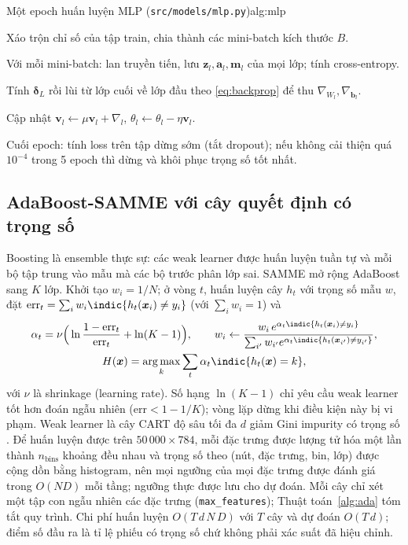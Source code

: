 \begin{algo}{Một epoch huấn luyện MLP (\texttt{src/models/mlp.py})}{alg:mlp}
\item Xáo trộn chỉ số của tập train, chia thành các mini-batch kích thước $B$.
\item Với mỗi mini-batch: lan truyền tiến, lưu $\bm z_l,\bm a_l,\bm m_l$ của mọi lớp; tính cross-entropy.
\item Tính $\bm\delta_L$ rồi lùi từ lớp cuối về lớp đầu theo \cref{eq:backprop} để thu $\nabla_{W_l},\nabla_{\bm b_l}$.
\item Cập nhật $\bm v_l\leftarrow\mu\bm v_l+\nabla_l$, $\theta_l\leftarrow\theta_l-\eta\bm v_l$.
\item Cuối epoch: tính loss trên tập dừng sớm (tắt dropout); nếu không cải thiện quá $10^{-4}$ trong 5 epoch thì dừng và khôi phục trọng số tốt nhất.
\end{algo}

\subsection{AdaBoost-SAMME với cây quyết định có trọng số}
\label{sec:ada}
Boosting là ensemble thực sự: các weak learner được huấn luyện tuần tự và mỗi bộ tập trung vào mẫu mà các bộ trước phân lớp sai. SAMME \citep{zhu2009} mở rộng AdaBoost \citep{freund1997} sang $K$ lớp. Khởi tạo $w_i=1/N$; ở vòng $t$, huấn luyện cây $h_t$ với trọng số mẫu $w$, đặt $\mathrm{err}_t=\sum_i w_i\indic{h_t(\bm x_i)\ne y_i}$ (với $\sum_i w_i=1$) và
\begin{equation}
\begin{gathered}
\alpha_t=\nu\Big(\ln\frac{1-\mathrm{err}_t}{\mathrm{err}_t}+\ln(K-1)\Big),\qquad
w_i\leftarrow \frac{w_i\,e^{\alpha_t\indic{h_t(\bm x_i)\ne y_i}}}{\sum_{i'}w_{i'}e^{\alpha_t\indic{h_t(\bm x_{i'})\ne y_{i'}}}},\\
H(\bm x)=\argmax_k\sum_{t}\alpha_t\indic{h_t(\bm x)=k},
\end{gathered}
\label{eq:samme}
\end{equation}
với $\nu$ là shrinkage (learning rate). Số hạng $\ln(K-1)$ chỉ yêu cầu weak learner tốt hơn đoán ngẫu nhiên ($\mathrm{err}<1-1/K$); vòng lặp dừng khi điều kiện này bị vi phạm. Weak learner là cây CART độ sâu tối đa $d$ giảm Gini impurity có trọng số \citep{breiman1984}. Để huấn luyện được trên $50\,000\times784$, mỗi đặc trưng được lượng tử hóa một lần thành $n_{\text{bins}}$ khoảng đều nhau và trọng số theo (nút, đặc trưng, bin, lớp) được cộng dồn bằng histogram, nên mọi ngưỡng của mọi đặc trưng được đánh giá trong $O(ND)$ mỗi tầng; ngưỡng thực được lưu cho dự đoán. Mỗi cây chỉ xét một tập con ngẫu nhiên các đặc trưng (\texttt{max\_features}); Thuật toán~\ref{alg:ada} tóm tắt quy trình. Chi phí huấn luyện $O(T\,d\,N\,D)$ với $T$ cây và dự đoán $O(T\,d)$; điểm số đầu ra là tỉ lệ phiếu có trọng số chứ không phải xác suất đã hiệu chỉnh.

